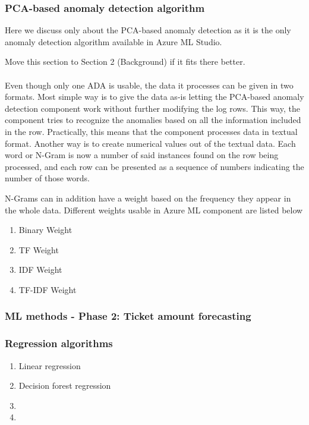 \subsubsection*{PCA-based anomaly detection algorithm}
Here we discuss only about the PCA-based anomaly detection
as it is the only anomaly detection algorithm available
in Azure ML Studio.

Move this section to Section 2 (Background)
if it fits there better.
\\ \\

Even though only one ADA is usable, %
the data it processes can be given in two formats.
Most simple way is to give the data as-is
letting the PCA-based anomaly detection component
work without further modifying the log rows.
This way,
the component tries to recognize the anomalies
based on all the information included in the row.
Practically,
this means that the component processes data in textual format.
Another way
is to create numerical values
out of the textual data.
Each word or N-Gram %
is now a number of said instances found on
the row being processed,
and each row can be presented
as a sequence of numbers
indicating the number of those words.

N-Grams can in addition have a weight
based on the frequency they appear
in the whole data.
Different weights usable in Azure ML component
are listed below

\begin{enumerate}
    \item Binary Weight
    \item TF Weight
    \item IDF Weight
    \item TF-IDF Weight
\end{enumerate}


\subsubsection{ML methods - Phase 2: Ticket amount forecasting}\label{meth-mlmeth2-ticket-amount-forecasting}


\subsubsection*{Regression algorithms}

\begin{enumerate}
    \item Linear regression
    \item Decision forest regression
    \item \etc
    \item \etc
\end{enumerate}


\clearpage